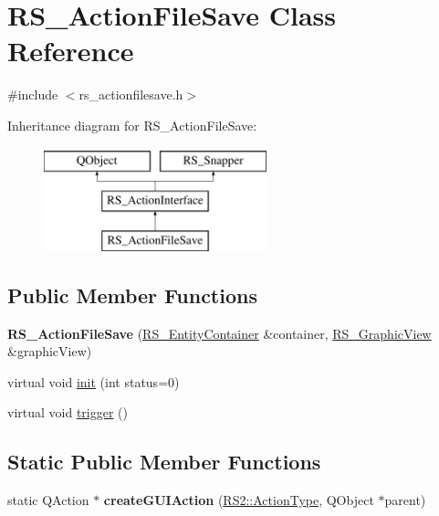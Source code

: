 \hypertarget{classRS__ActionFileSave}{\section{R\-S\-\_\-\-Action\-File\-Save Class Reference}
\label{classRS__ActionFileSave}
}


{\ttfamily \#include $<$rs\-\_\-actionfilesave.\-h$>$}

Inheritance diagram for R\-S\-\_\-\-Action\-File\-Save\-:\begin{figure}[H]
\begin{center}
\leavevmode
\includegraphics[height=3.000000cm]{classRS__ActionFileSave}
\end{center}
\end{figure}
\subsection*{Public Member Functions}
\begin{DoxyCompactItemize}
\item 
\hypertarget{classRS__ActionFileSave_a32bc37e8f1af87e8f52cd462e26b34a0}{{\bfseries R\-S\-\_\-\-Action\-File\-Save} (\hyperlink{classRS__EntityContainer}{R\-S\-\_\-\-Entity\-Container} \&container, \hyperlink{classRS__GraphicView}{R\-S\-\_\-\-Graphic\-View} \&graphic\-View)}\label{classRS__ActionFileSave_a32bc37e8f1af87e8f52cd462e26b34a0}

\item 
virtual void \hyperlink{classRS__ActionFileSave_ad3b44b9e795bf8800dbefc859855b17c}{init} (int status=0)
\item 
virtual void \hyperlink{classRS__ActionFileSave_aca1beea397ad5405770f097b363c6ba9}{trigger} ()
\end{DoxyCompactItemize}
\subsection*{Static Public Member Functions}
\begin{DoxyCompactItemize}
\item 
\hypertarget{classRS__ActionFileSave_a3673e7098637092682548ea55ba5c445}{static Q\-Action $\ast$ {\bfseries create\-G\-U\-I\-Action} (\hyperlink{classRS2_afe3523e0bc41fd637b892321cfc4b9d7}{R\-S2\-::\-Action\-Type}, Q\-Object $\ast$parent)}\label{classRS__ActionFileSave_a3673e7098637092682548ea55ba5c445}

\end{DoxyCompactItemize}
